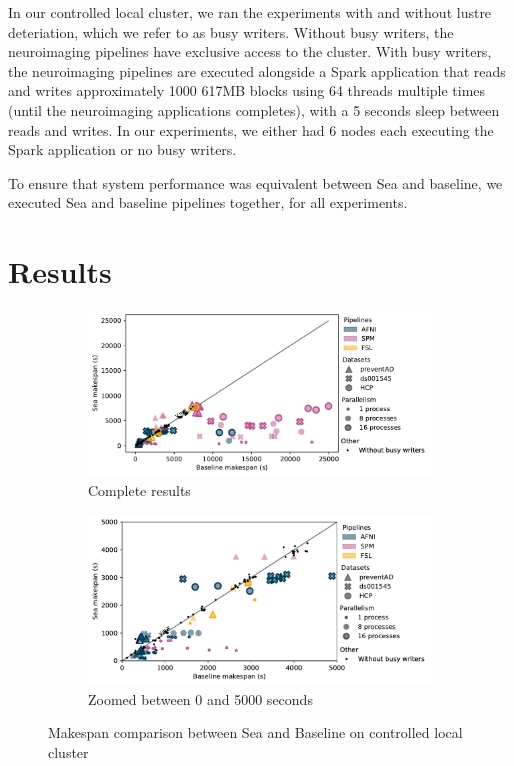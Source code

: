     In our controlled local cluster, we ran the experiments with and without lustre deteriation, which we refer to as busy writers. Without
    busy writers, the neuroimaging pipelines have exclusive access to the cluster. With busy writers, the neuroimaging pipelines are executed alongside
    a Spark application that reads and writes approximately 1000 617MB blocks using 64 threads multiple times (until the neuroimaging applications completes),
    with a 5 seconds sleep between reads and writes. In our experiments, we either had 6 nodes each executing the Spark application or no busy writers.

    To ensure that system performance was equivalent between Sea and baseline, we executed Sea and baseline pipelines together, for all experiments.
    
    \section{Results}


\begin{figure}

\begin{subfigure}{\textwidth}
    \centering
    \captionsetup{width=.85\linewidth}
    \includegraphics[width=\columnwidth]{figures/sea-neuro/slashbin_results.pdf}%
    \caption{Complete results}\label{fig:seaneuro:slashbinfull}
\end{subfigure}
\begin{subfigure}{\textwidth}
    \centering
    \captionsetup{width=.85\linewidth}
    \includegraphics[width=\linewidth]{figures/sea-neuro/slashbin_results_zoomed.pdf}
    \caption{Zoomed between 0 and 5000 seconds}\label{fig:seaneuro:slashbinzoom}
\end{subfigure}
\caption{Makespan comparison between Sea and Baseline on controlled local cluster}
\label{fig:seaneuro:slashbin}
\end{figure}

